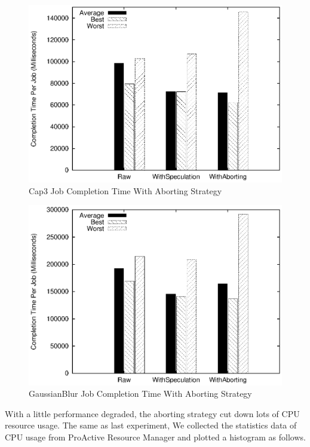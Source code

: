 \begin{figure}
\centering
\includegraphics[width=0.9\columnwidth]{figures/abort_completiontime_cap3.eps}
\caption{Cap3 Job Completion Time With Aborting Strategy}
\label{figure:abort_completiontime_cap3}
\end{figure}

\begin{figure}
\centering
\includegraphics[width=0.9\columnwidth]{figures/abort_completiontime_gaussianblur.eps}
\caption{GaussianBlur Job Completion Time With Aborting Strategy}
\label{figure:abort_completiontime_gaussianblur}
\end{figure}

With a little performance degraded, the aborting strategy cut down lots of CPU resource usage. The same as last experiment, We collected the statistics data of CPU usage from ProActive Resource Manager and plotted a histogram as follows.

